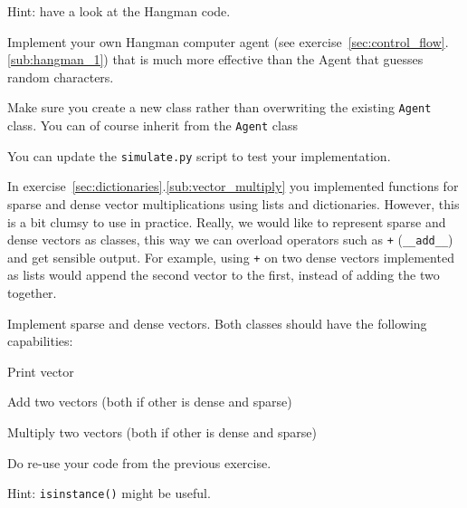 \begin{questions}

        Hint: have a look at the Hangman code.

    \label{sub:hangman_agent}

    Implement your own Hangman computer agent (see exercise~\ref{sec:control_flow}.\ref{sub:hangman_1})
    that is much more effective than the Agent that guesses random characters.

    Make sure you create a new class rather than overwriting the existing \texttt{Agent}
    class. You can of course inherit from the \texttt{Agent} class

    You can update the \texttt{simulate.py} script to test your implementation.

    \label{sub:vector_class}
    In exercise~\ref{sec:dictionaries}.\ref{sub:vector_multiply} you implemented
    functions for sparse and dense vector multiplications using lists and dictionaries.
    However, this is a bit clumsy to use in practice.
    Really, we would like to represent sparse and dense vectors as classes,
    this way we can overload operators such as \texttt{+} (\texttt{\_\_add\_\_})
    and get sensible output.
    For example, using \texttt{+} on two dense vectors implemented as lists would
    append the second vector to the first, instead of adding the two together.

    Implement sparse and dense vectors.
    Both classes should have the following capabilities:
    \begin{parts}
        \item Print vector
        \item Add two vectors (both if other is dense and sparse)
        \item Multiply two vectors (both if other is dense and sparse)
    \end{parts}
    Do re-use your code from the previous exercise.

    Hint: \texttt{isinstance()} might be useful.

    \label{sub:set_as_dict}


\end{questions}
